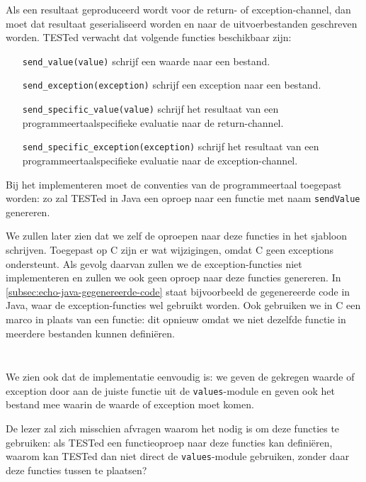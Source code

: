 \inputminted[firstline=13,lastline=21]{mako}{sources/c-context.mako}

Als een resultaat geproduceerd wordt voor de return- of exception-channel, dan moet dat resultaat geserialiseerd worden en naar de uitvoerbestanden geschreven worden.
TESTed verwacht dat volgende functies beschikbaar zijn:

\begin{itemize}
    \item[\texttt{send\_value(value)}] schrijf een waarde naar een bestand.
    \item[\texttt{send\_exception(exception)}] schrijf een exception naar een bestand.
    \item[\texttt{send\_specific\_value(value)}] schrijf het resultaat van een programmeertaalspecifieke evaluatie naar de return-channel.
    \item[\texttt{send\_specific\_exception(exception)}] schrijf het resultaat van een programmeertaalspecifieke evaluatie naar de exception-channel.
\end{itemize}

Bij het implementeren moet de conventies van de programmeertaal toegepast worden: zo zal TESTed in Java een oproep naar een functie met naam \texttt{sendValue} genereren.

We zullen later zien dat we zelf de oproepen naar deze functies in het sjabloon schrijven.
Toegepast op C zijn er wat wijzigingen, omdat C geen exceptions ondersteunt.
Als gevolg daarvan zullen we de exception-functies niet implementeren en zullen we ook geen oproep naar deze functies genereren.
In \cref{subsec:echo-java-gegenereerde-code} staat bijvoorbeeld de gegenereerde code in Java, waar de exception-functies wel gebruikt worden.
Ook gebruiken we in C een marco in plaats van een functie: dit opnieuw omdat we niet dezelfde functie in meerdere bestanden kunnen definiëren.

\inputminted[firstline=25,lastline=27]{mako}{sources/c-context.mako}
\vspace{-1.7cm} %
\inputminted[firstline=29,lastline=30]{mako}{sources/c-context.mako}

We zien ook dat de implementatie eenvoudig is: we geven de gekregen waarde of exception door aan de juiste functie uit de \texttt{values}-module en geven ook het bestand mee waarin de waarde of exception moet komen.

De lezer zal zich misschien afvragen waarom het nodig is om deze functies te gebruiken: als TESTed een functieoproep naar deze functies kan definiëren, waarom kan TESTed dan niet direct de \texttt{values}-module gebruiken, zonder daar deze functies tussen te plaatsen?

